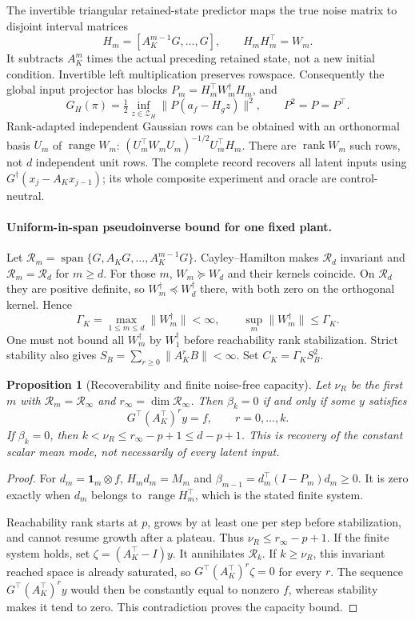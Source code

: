 \documentclass[11pt]{article}
\newtheorem{proposition}{Proposition}
\begin{document}
The invertible triangular retained-state predictor maps the true noise
matrix to disjoint interval matrices
\[
H_m=[A_K^{m-1}G,\ldots,G],\qquad H_mH_m^\top=W_m.
\]
It subtracts $A_K^m$ times the actual preceding retained state, not a new
initial condition. Invertible left multiplication preserves rowspace.
Consequently the global input projector has blocks
$P_m=H_m^\top W_m^\dagger H_m$, and
\begin{equation}\label{eq:experiment}
G_H(\pi)=\tfrac12\inf_{z\in\mathcal Z_H}
\|P(a_f-H_gz)\|^2,\qquad P^2=P=P^\top.
\end{equation}
Rank-adapted independent Gaussian rows can be obtained with an orthonormal
basis $U_m$ of $\operatorname{range}W_m$:
$(U_m^\top W_mU_m)^{-1/2}U_m^\top H_m$.
There are $\operatorname{rank}W_m$ such rows, not $d$ independent unit rows.
The complete record recovers all latent inputs using
$G^\dagger(x_j-A_Kx_{j-1})$; its whole composite experiment and oracle are
control-neutral.

\paragraph{Uniform-in-span pseudoinverse bound for one fixed plant.}
Let
$\mathcal R_m=\operatorname{span}\{G,A_KG,\ldots,A_K^{m-1}G\}$.
Cayley--Hamilton makes $\mathcal R_d$ invariant and
$\mathcal R_m=\mathcal R_d$ for $m\ge d$.
For those $m$, $W_m\succeq W_d$ and their kernels coincide.
On $\mathcal R_d$ they are positive definite, so
$W_m^\dagger\preceq W_d^\dagger$ there, with both zero on the orthogonal kernel.
Hence
\[
\Gamma_K=\max_{1\le m\le d}\|W_m^\dagger\|<\infty,\qquad
\sup_m\|W_m^\dagger\|\le\Gamma_K.
\]
One must not bound all $W_m^\dagger$ by $W_1^\dagger$ before reachability
rank stabilization.
Strict stability also gives $S_B=\sum_{r\ge0}\|A_K^rB\|<\infty$.
Set $C_K=\Gamma_KS_B^2$.

\begin{proposition}[Recoverability and finite noise-free capacity]\label{prop:capacity}
Let $\nu_R$ be the first $m$ with $\mathcal R_m=\mathcal R_\infty$ and
$r_\infty=\dim\mathcal R_\infty$.
Then $\beta_k=0$ if and only if some $y$ satisfies
\[
G^\top(A_K^\top)^r y=f,\qquad r=0,\ldots,k.
\]
If $\beta_k=0$, then
$k<\nu_R\le r_\infty-p+1\le d-p+1$.
This is recovery of the constant scalar mean mode, not necessarily of
every latent input.
\end{proposition}
\begin{proof}
For $d_m=\mathbf1_m\otimes f$, $H_md_m=M_m$ and
$\beta_{m-1}=d_m^\top(I-P_m)d_m\ge0$.
It is zero exactly when $d_m$ belongs to $\operatorname{range}H_m^\top$,
which is the stated finite system.

Reachability rank starts at $p$, grows by at least one per step before
stabilization, and cannot resume growth after a plateau.
Thus $\nu_R\le r_\infty-p+1$.
If the finite system holds, set $\zeta=(A_K^\top-I)y$.
It annihilates $\mathcal R_k$.
If $k\ge\nu_R$, this invariant reached space is already saturated, so
$G^\top(A_K^\top)^r\zeta=0$ for every $r$.
The sequence $G^\top(A_K^\top)^r y$ would then be constantly equal to
nonzero $f$, whereas stability makes it tend to zero. This contradiction
proves the capacity bound.
\end{proof}
\end{document}
